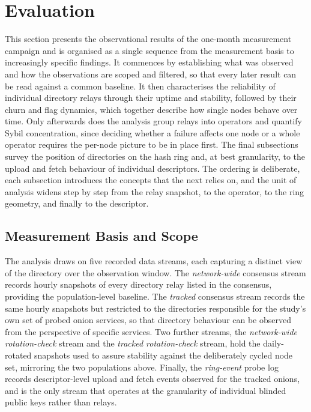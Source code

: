 \documentclass[conference]{IEEEtran}
\begin{document}
\section{Evaluation}
 
This section presents the observational results of the one-month measurement campaign and is organised as a single sequence from the measurement basis to increasingly specific findings. It commences
by establishing what was observed and how the observations are scoped and filtered, so that every later result can be read against a common baseline. It then characterises the reliability of 
individual directory relays through their uptime and stability, followed by their churn and flag dynamics, which together describe how single nodes behave over time. Only afterwards does the analysis 
group relays into operators and quantify Sybil concentration, since deciding whether a failure affects one node or a whole operator requires the per-node picture to be in place first. The final 
subsections survey the position of directories on the hash ring and, at best granularity, to the upload and fetch behaviour of individual descriptors. The ordering is deliberate, each 
subsection introduces the concepts that the next relies on, and the unit of analysis widens step by step from the relay snapshot, to the operator, to the ring geometry, and finally to the descriptor.
 
\subsection{Measurement Basis and Scope}
 
The analysis draws on five recorded data streams, each capturing a distinct view of the directory over the observation window. The \textit{network-wide} consensus stream records hourly snapshots of 
every directory relay listed in the consensus, providing the population-level baseline. The \textit{tracked} consensus stream records the same hourly snapshots but restricted to the directories 
responsible for the study's own set of probed onion services, so that directory behaviour can be observed from the perspective of specific services. Two further streams, the \textit{network-wide rotation-check} stream 
and the \textit{tracked rotation-check} stream, hold the daily-rotated snapshots used to assure stability against the deliberately cycled node set, mirroring the two populations above. 
Finally, the \textit{ring-event} probe log records descriptor-level upload and fetch events observed for the tracked onions, and is the only stream that operates at the granularity of individual 
blinded public keys rather than relays.
 
\end{document}
